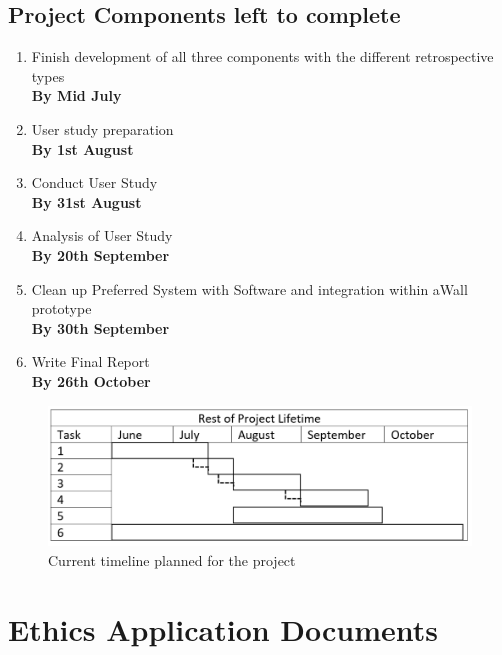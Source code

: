 \documentclass[11pt
              , a4paper
              , twoside
              , openright
              ]{report}
\begin{document}
\section{Project Components left to complete}
\begin{enumerate}
	\item Finish development of all three components with the different retrospective types \\ \textbf{By Mid July}
	\item User study preparation \\ \textbf{By 1st August}
	\item Conduct User Study \\ \textbf{By 31st August}
	\item Analysis of User Study \\ \textbf{By 20th September}
	\item Clean up Preferred System with Software and integration within aWall prototype \\ \textbf{By 30th September}
	\item Write Final Report \\ \textbf{By 26th October}  
\end{enumerate}
\begin{figure}[ht]
	\centering
	\includegraphics{timeline}
	\caption{Current timeline planned for the project}
\end{figure}



\backmatter



%



\appendix
\chapter{Ethics Application Documents}

\end{document}
